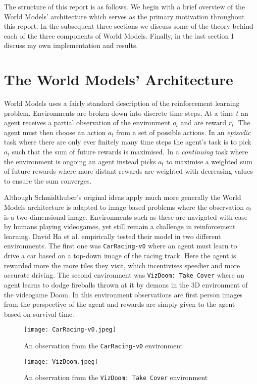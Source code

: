 \documentclass{article}
\theoremstyle{definition}
\begin{document}
The structure of this report is as follows.
We begin with a brief overview of the World Models' architecture which serves as the primary motivation throughout this report.
In the subsequent three sections we discuss some of the theory behind each of the three components of World Models.
Finally, in the last section I discuss my own implementation and results.

\section{The World Models' Architecture}
World Models uses a fairly standard description of the reinforcement learning problem.
Environments are broken down into discrete time steps.
At a time $t$ an agent receives a partial observation of the environment $o_t$ and are reward $r_t$.
The agent must then choose an action $a_t$ from a set of possible actions.
In an \textit{episodic} task where there are only ever finitely many time steps the agent's task is to pick $a_t$ such that the sum of future rewards is maximised.
In a \textit{continuing} task where the environment is ongoing an agent instead picks $a_t$ to maximise a weighted sum of future rewards where more distant rewards are weighted with decreasing values to ensure the sum converges.

Although Schmidthuber's original ideas apply much more generally the World Models architecture is adapted to image based problems where the observation $o_t$ is a two dimensional image.
Environments such as these are navigated with ease by humans playing videogames, yet still remain a challenge in reinforcement learning.
David Ha et al. empirically tested their model in two different environments.
The first one was \texttt{CarRacing-v0} where an agent must learn to drive a car based on a top-down image of the racing track. %
Here the agent is rewarded more the more tiles they visit, which incentivises speedier and more accurate driving.
The second environment was \texttt{VizDoom: Take Cover} where an agent learns to dodge fireballs thrown at it by demons in the 3D environment of the videogame Doom.
In this environment observations are first person images from the perspective of the agent and rewards are simply given to the agent based on survival time.

\begin{figure}[h]
  \centering
  \begin{minipage}{0.45\textwidth}
      \centering
      \texttt{[image: CarRacing-v0.jpeg]} %
      \caption{An observation from the \texttt{CarRacing-v0} environment}
  \end{minipage}\hfill
  \begin{minipage}{0.45\textwidth}
      \centering
      \texttt{[image: VizDoom.jpeg]} %
      \caption{An observation from the \texttt{VizDoom: Take Cover} environment}
  \end{minipage}
\end{figure}
\end{document}
